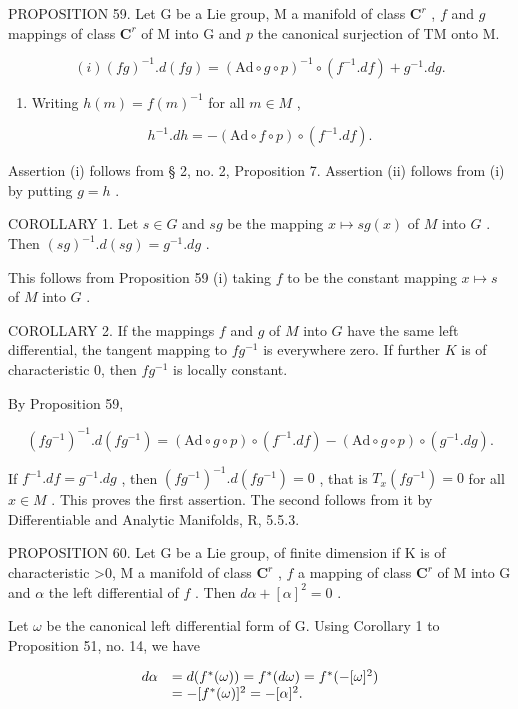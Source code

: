 PROPOSITION 59. Let G be a Lie group, M a manifold of class \(\mathbf{C}^r\) , \(f\) and \(g\) mappings of class \(\mathbf{C}^r\) of M into G and \(p\) the canonical surjection of TM onto M.

\[
(i) (f g) ^ {- 1}. d (f g) = (\mathrm{Ad} \circ g \circ p) ^ {- 1} \circ (f ^ {- 1}. d f) + g ^ {- 1}. d g.
\]

\begin{enumerate}
\def\labelenumi{(\roman{enumi})}
\setcounter{enumi}{1}
\tightlist
\item
  Writing \(h(m) = f(m)^{-1}\) for all \(m \in M\) ,
\end{enumerate}

\[
h ^ {- 1}. d h = - (\mathrm{Ad} \circ f \circ p) \circ (f ^ {- 1}. d f).
\]

Assertion (i) follows from § 2, no. 2, Proposition 7. Assertion (ii) follows from (i) by putting \(g = h\) .

COROLLARY 1. Let \(s \in G\) and \(sg\) be the mapping \(x \mapsto sg(x)\) of \(M\) into \(G\) . Then \((sg)^{-1}.d(sg) = g^{-1}.dg\) .

This follows from Proposition 59 (i) taking \(f\) to be the constant mapping \(x \mapsto s\) of \(M\) into \(G\) .

COROLLARY 2. If the mappings \(f\) and \(g\) of \(M\) into \(G\) have the same left differential, the tangent mapping to \(fg^{-1}\) is everywhere zero. If further \(K\) is of characteristic 0, then \(fg^{-1}\) is locally constant.

By Proposition 59,

\[
(f g ^ {- 1}) ^ {- 1}. d (f g ^ {- 1}) = (\mathrm{Ad} \circ g \circ p) \circ (f ^ {- 1}. d f) - (\mathrm{Ad} \circ g \circ p) \circ (g ^ {- 1}. d g).
\]

If \(f^{-1}.df = g^{-1}.dg\) , then \((fg^{-1})^{-1}.d(fg^{-1}) = 0\) , that is \(T_x(fg^{-1}) = 0\) for all \(x \in M\) . This proves the first assertion. The second follows from it by Differentiable and Analytic Manifolds, R, 5.5.3.

PROPOSITION 60. Let G be a Lie group, of finite dimension if K is of characteristic \textgreater0, M a manifold of class \(\mathbf{C}^r\) , \(f\) a mapping of class \(\mathbf{C}^r\) of M into G and \(\alpha\) the left differential of \(f\) . Then \(d\alpha + [\alpha]^2 = 0\) .

Let \(\omega\) be the canonical left differential form of G. Using Corollary 1 to Proposition 51, no. 14, we have

\[
\begin{array}{r l} d \alpha & = d (f ^ {*} (\omega)) = f ^ {*} (d \omega) = f ^ {*} (- [ \omega ] ^ {2}) \\ & = - [ f ^ {*} (\omega) ] ^ {2} = - [ \alpha ] ^ {2}. \end{array}
\]

